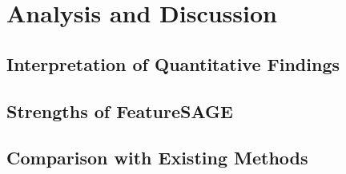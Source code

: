 \section{Analysis and Discussion}

\subsection{Interpretation of Quantitative Findings}


\subsection{Strengths of FeatureSAGE}


\subsection{Comparison with Existing Methods}